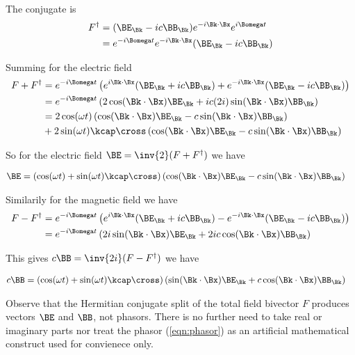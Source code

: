 The conjugate is
\begin{align*}
F^\dagger 
&= (\BE_\Bk - i c \BB_\Bk) e^{-i \Bk \cdot \Bx} e^{i\Bomega t} \\
&= 
e^{-i\Bomega t}
e^{-i \Bk \cdot \Bx} 
(\BE_\Bk - i c \BB_\Bk) 
\end{align*}

Summing for the electric field
\begin{align*}
F + F^\dagger
&=
e^{-i\Bomega t} \left(
 e^{i \Bk \cdot \Bx} (\BE_\Bk + i c \BB_\Bk) 
+e^{-i \Bk \cdot \Bx} (\BE_\Bk - i c \BB_\Bk)  
\right) \\
&=
e^{-i\Bomega t} \left(
 2 \cos(\Bk \cdot \Bx) \BE_\Bk 
+ i c (2 i) \sin(\Bk \cdot \Bx) \BB_\Bk 
\right) \\
&=
2 \cos(\omega t) \left(
 \cos(\Bk \cdot \Bx) \BE_\Bk 
- c \sin(\Bk \cdot \Bx) \BB_\Bk 
\right) \\
&+ 2 
\sin(\omega t)
\kcap \cross 
\left(
 \cos(\Bk \cdot \Bx) \BE_\Bk 
- c \sin(\Bk \cdot \Bx) \BB_\Bk 
\right) \\
\end{align*}

So for the electric field $\BE = \inv{2}(F + F^\dagger)$ we have

\begin{align}\label{eqn:electricSplit}
\BE &= 
\left( \cos(\omega t) + \sin(\omega t) \kcap \cross \right)
\left(
 \cos(\Bk \cdot \Bx) \BE_\Bk 
- c \sin(\Bk \cdot \Bx) \BB_\Bk 
\right) 
\end{align}

Similarily for the magnetic field we have
\begin{align*}
F - F^\dagger
&=
e^{-i\Bomega t} \left(
 e^{i \Bk \cdot \Bx} (\BE_\Bk + i c \BB_\Bk) 
-e^{-i \Bk \cdot \Bx} (\BE_\Bk - i c \BB_\Bk)  
\right) \\
&=
e^{-i\Bomega t} \left(
 2 i \sin(\Bk \cdot \Bx) \BE_\Bk 
+ 2 i c \cos(\Bk \cdot \Bx) \BB_\Bk 
\right) \\
\end{align*}

This gives $c \BB = \inv{2i}(F - F^\dagger)$ we have

\begin{align}\label{eqn:magneticSplit}
c \BB &=
\left( \cos(\omega t) + \sin(\omega t) \kcap \cross \right)
\left(
 \sin(\Bk \cdot \Bx) \BE_\Bk 
+ c \cos(\Bk \cdot \Bx) \BB_\Bk 
\right) 
\end{align}

Observe that the Hermitian conjugate split of the total field bivector $F$ 
produces vectors $\BE$ and $\BB$, not phasors.  There is no further need to
take real or imaginary parts nor treat the phasor (\ref{eqn:phasor}) as an artificial mathematical
construct used for convienece only.

